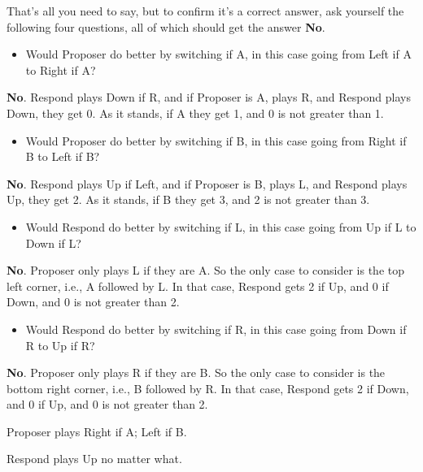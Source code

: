 \documentclass[
  12pt,
  letterpaper,
  DIV=11,
  numbers=noendperiod]{scrartcl}
\providecommand{\tightlist}{%
  \setlength{\itemsep}{0pt}\setlength{\parskip}{0pt}}\usepackage{longtable,booktabs,array}
\begin{document}
That's all you need to say, but to confirm it's a correct answer, ask
yourself the following four questions, all of which should get the
answer \textbf{No}.

\begin{itemize}
\tightlist
\item
  Would Proposer do better by switching if A, in this case going from
  Left if A to Right if A?
\end{itemize}

\textbf{No}. Respond plays Down if R, and if Proposer is A, plays R, and
Respond plays Down, they get 0. As it stands, if A they get 1, and 0 is
not greater than 1.

\begin{itemize}
\tightlist
\item
  Would Proposer do better by switching if B, in this case going from
  Right if B to Left if B?
\end{itemize}

\textbf{No}. Respond plays Up if Left, and if Proposer is B, plays L,
and Respond plays Up, they get 2. As it stands, if B they get 3, and 2
is not greater than 3.

\begin{itemize}
\tightlist
\item
  Would Respond do better by switching if L, in this case going from Up
  if L to Down if L?
\end{itemize}

\textbf{No}. Proposer only plays L if they are A. So the only case to
consider is the top left corner, i.e., A followed by L. In that case,
Respond gets 2 if Up, and 0 if Down, and 0 is not greater than 2.

\begin{itemize}
\tightlist
\item
  Would Respond do better by switching if R, in this case going from
  Down if R to Up if R?
\end{itemize}

\textbf{No}. Proposer only plays R if they are B. So the only case to
consider is the bottom right corner, i.e., B followed by R. In that
case, Respond gets 2 if Down, and 0 if Up, and 0 is not greater than 2.

\begin{description}
\tightlist
\item[Answer Two]
Proposer plays Right if A; Left if B.

Respond plays Up no matter what.
\end{description}
\end{document}
